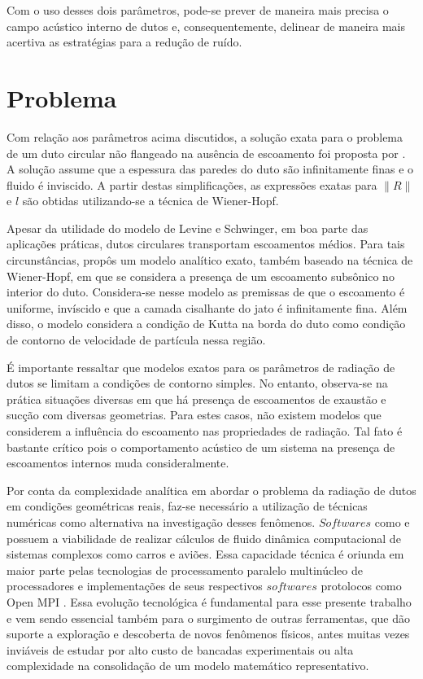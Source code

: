 Com o uso desses dois parâmetros, pode-se prever de maneira mais precisa o campo acústico interno de dutos e, consequentemente, delinear de maneira mais acertiva as estratégias para a redução de ruído.

\section{Problema}

Com relação aos parâmetros acima discutidos, a solução exata para o problema de um duto circular não flangeado na ausência de escoamento foi proposta por . A solução assume que a espessura das paredes do duto são infinitamente finas e o fluido é inviscido. A partir destas simplificações, as expressões exatas para $\|R\|$ e $l$ são obtidas utilizando-se a técnica de Wiener-Hopf.

Apesar da utilidade do modelo de Levine e Schwinger, em boa parte das aplicações práticas, dutos circulares transportam escoamentos médios. Para tais circunstâncias,  propôs um modelo analítico exato, também baseado na técnica de Wiener-Hopf, em que se considera a presença de um escoamento subsônico no interior do duto. Considera-se nesse modelo as premissas de que o escoamento é uniforme, invíscido e que a camada cisalhante do jato é infinitamente fina. Além disso, o modelo considera a condição de Kutta na borda do duto como condição de contorno de velocidade de partícula nessa região.

É importante ressaltar que modelos exatos para os parâmetros de radiação de dutos se limitam a condições de contorno simples. No entanto, observa-se na prática situações diversas em que há presença de escoamentos de exaustão e sucção com diversas geometrias. Para estes casos, não existem modelos que considerem a influência do escoamento nas propriedades de radiação. Tal fato é bastante crítico pois o comportamento acústico de um sistema na presença de escoamentos internos muda consideralmente.

Por conta da complexidade analítica em abordar o problema da radiação de dutos em condições geométricas reais, faz-se necessário a utilização de técnicas numéricas como alternativa na investigação desses fenômenos. $Softwares$ como  e  possuem a viabilidade de realizar cálculos de fluido dinâmica computacional de sistemas complexos como carros e aviões. Essa capacidade técnica é oriunda em maior parte pelas tecnologias de processamento paralelo multinúcleo de processadores e implementações de seus respectivos $softwares$ protolocos como Open MPI . Essa evolução tecnológica é fundamental para esse presente trabalho e vem sendo essencial também para o surgimento de outras ferramentas, que dão suporte a exploração e descoberta de novos fenômenos físicos, antes muitas vezes inviáveis de estudar por alto custo de bancadas experimentais ou alta complexidade na consolidação de um modelo matemático representativo. 


